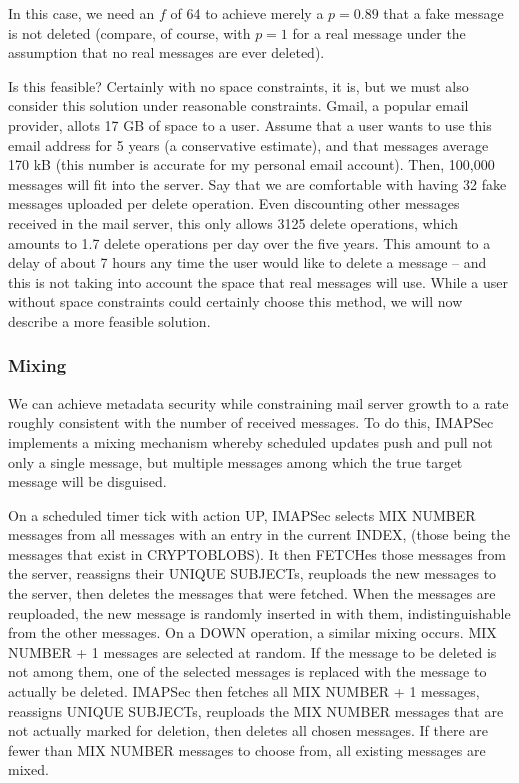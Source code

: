 \documentclass[pageno]{jpaper}
\newcommand{\project}{IMAPSec }
\begin{document}
In this case, we need an $f$ of 64 to achieve merely a $p=0.89$ that a fake message is not deleted (compare, of course, with $p=1$ for a real message under the assumption that no real messages are ever deleted).

Is this feasible? Certainly with no space constraints, it is, but we must also consider this solution under reasonable constraints. Gmail, a popular email provider, allots 17 GB of space to a user. Assume that a user wants to use this email address for 5 years (a conservative estimate), and that messages average 170 kB (this number is accurate for my personal email account). Then, 100,000 messages will fit into the server. Say that we are comfortable with having 32 fake messages uploaded per delete operation. Even discounting other messages received in the mail server, this only allows 3125 delete operations, which amounts to 1.7 delete operations per day over the five years. This amount to a delay of about 7 hours any time the user would like to delete a message \--- and this is not taking into account the space that real messages will use. While a user without space constraints could certainly choose this method, we will now describe a more feasible solution.

\subsubsection{Mixing}
We can achieve metadata security while constraining mail server growth to a rate roughly consistent with the number of received messages. To do this, \project implements a mixing mechanism whereby scheduled updates push and pull not only a single message, but multiple messages among which the true target message will be disguised.

On a scheduled timer tick with action UP, \project selects MIX NUMBER messages from all messages with an entry in the current INDEX, (those being the messages that exist in CRYPTOBLOBS). It then FETCHes those messages from the server, reassigns their UNIQUE SUBJECTs, reuploads the new messages to the server, then deletes the messages that were fetched. When the messages are reuploaded, the new message is randomly inserted in with them, indistinguishable from the other messages. On a DOWN operation, a similar mixing occurs. MIX NUMBER + 1 messages are selected at random. If the message to be deleted is not among them, one of the selected messages is replaced with the message to actually be deleted. \project then fetches all MIX NUMBER + 1 messages, reassigns UNIQUE SUBJECTs, reuploads the MIX NUMBER messages that are not actually marked for deletion, then deletes all chosen messages. If there are fewer than MIX NUMBER messages to choose from, all existing messages are mixed.
\end{document}
